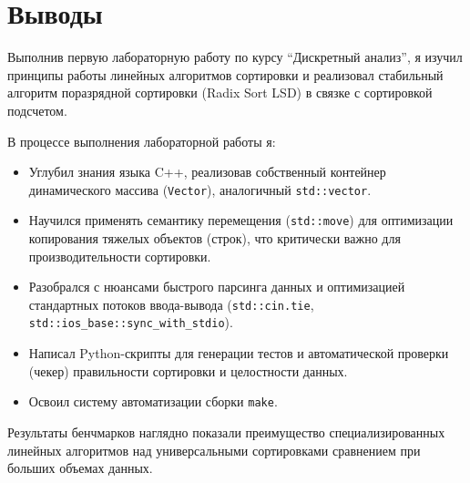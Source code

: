 \section{Выводы}

Выполнив первую лабораторную работу по курсу \enquote{Дискретный анализ}, я изучил принципы работы линейных алгоритмов сортировки и реализовал стабильный алгоритм поразрядной сортировки (Radix Sort LSD) в связке с сортировкой подсчетом.

В процессе выполнения лабораторной работы я:
\begin{itemize}
    \item Углубил знания языка C++, реализовав собственный контейнер динамического массива (\texttt{Vector}), аналогичный \texttt{std::vector}.
    \item Научился применять семантику перемещения (\texttt{std::move}) для оптимизации копирования тяжелых объектов (строк), что критически важно для производительности сортировки.
    \item Разобрался с нюансами быстрого парсинга данных и оптимизацией стандартных потоков ввода-вывода (\texttt{std::cin.tie}, \texttt{std::ios\_base::sync\_with\_stdio}).
    \item Написал Python-скрипты для генерации тестов и автоматической проверки (чекер) правильности сортировки и целостности данных.
    \item Освоил систему автоматизации сборки \texttt{make}.
\end{itemize}

Результаты бенчмарков наглядно показали преимущество специализированных линейных алгоритмов над универсальными сортировками сравнением при больших объемах данных.
\pagebreak